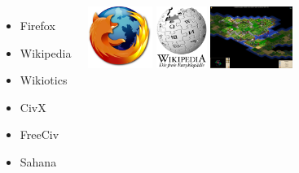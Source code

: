 \begin{frame} 

\begin{columns}[T] 
\column{1.5in} 
\begin{itemize}
	\item Firefox
  \item Wikipedia
	\item Wikiotics
	\item CivX
	\item FreeCiv
	\item Sahana
\end{itemize}

\column{1.5in} 
\includegraphics[height=2cm]{images/ff-logo.png}
\vspace{1cm}
\includegraphics[height=2cm]{images/wiki-logo.png}
\vspace{1cm}
\includegraphics[height=2cm]{images/freeciv-logo.png}

\end{columns}
\end{frame} 

